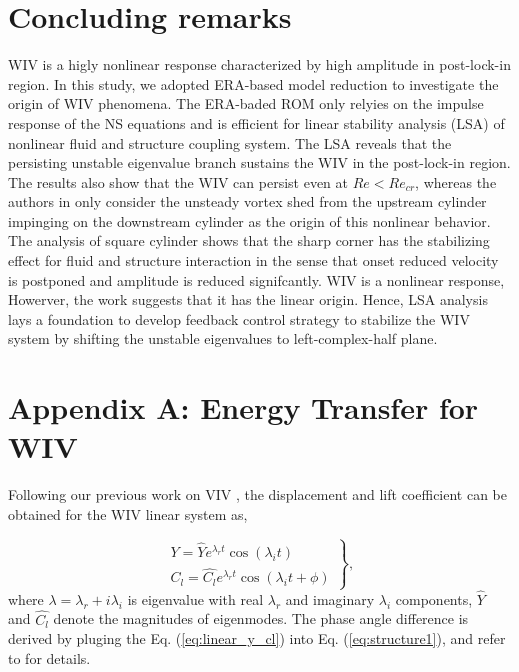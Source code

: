 \section{Concluding remarks}\label{sec:conclusion}
WIV is a higly nonlinear response characterized by high amplitude in post-lock-in region. 
In this study, we adopted ERA-based model reduction to investigate the origin of WIV phenomena. 
The ERA-baded ROM only relyies on the impulse response of the NS equations and is efficient 
for linear stability analysis (LSA) of nonlinear fluid and structure coupling system. 
The LSA reveals that the persisting unstable eigenvalue branch sustains the WIV in the post-lock-in 
region. The results also show that the WIV can persist even at $Re<Re_{cr}$, whereas the authors in \cite{Mysa2016,MYSA201727} 
only consider the unsteady vortex shed from the upstream cylinder impinging on the downstream cylinder as the origin of 
this nonlinear behavior. The analysis of square cylinder shows that the sharp corner has the stabilizing effect for 
fluid and structure interaction in the sense that onset reduced velocity is postponed and amplitude is reduced signifcantly. 
WIV is a nonlinear response, Howerver, the work suggests that it has the linear origin. Hence, 
LSA analysis lays a foundation to develop feedback control strategy to stabilize the WIV system by shifting the unstable 
eigenvalues to left-complex-half plane. 



\section*{Appendix A: Energy Transfer for WIV}\label{app:A} 

Following our previous work on VIV \cite{yao_jfm_1}, 
the displacement and lift coefficient can be obtained  for the WIV linear system as, 
 
\begin{equation}
\left. \begin{array}{ll}
\displaystyle Y=\hat{Y} e^{\lambda_r t}\cos(\lambda_i t)  \\[8pt]
\displaystyle C_l=\hat{C_l} e^{\lambda_r t}\cos(\lambda_i t + \phi)
\end{array}\right\},
\label{eq:linear_y_cl}
\end{equation}
where $\lambda=\lambda_r+i\lambda_i$ is eigenvalue with real $\lambda_r$ 
and imaginary $\lambda_i$ components, $\hat{Y}$ and $\hat{C_l}$ 
denote the magnitudes of eigenmodes. The phase angle difference is derived 
by pluging the Eq. (\ref{eq:linear_y_cl}) into Eq. (\ref{eq:structure1}), and refer
to \cite{yao_jfm_1} for details. 

